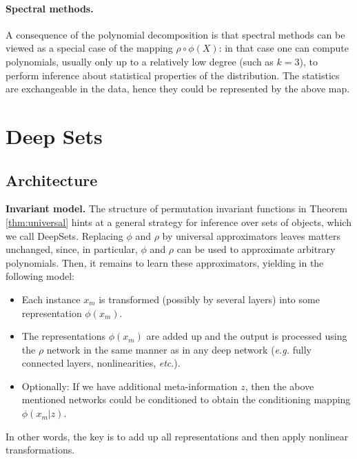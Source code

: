 \documentclass{article}
\newcommand{\refthm}[1]{Theorem \ref{#1}}
\newcommand{\latinphrase}[1]{\emph{#1}}    %
\newcommand{\eg}{\latinphrase{e.g.}\xspace}
\newcommand{\etc}{\latinphrase{etc}\xspace}
\newcommand{\deepsets}{DeepSets\xspace}
\begin{document}
\paragraph{Spectral methods.} 
A consequence of the polynomial decomposition is that spectral methods \cite{AnaGeHsuKakTel12} can be viewed as a special case of the mapping $\rho \circ \phi(X)$: in that case one can compute polynomials, usually only up to a relatively low degree (such as $k=3$), to perform inference about statistical properties of the distribution. The statistics are exchangeable in the data, hence they could be represented by the above map.


\section{Deep Sets}
\label{sec:deep-bs}
\subsection{Architecture}
\textbf{Invariant model.} The structure of permutation invariant functions in \refthm{thm:universal} hints at a general strategy for inference over sets of objects, which we call \deepsets. Replacing $\phi$ and $\rho$ by universal approximators leaves matters unchanged, since, in particular, $\phi$ and $\rho$ can be used to approximate arbitrary polynomials. Then, it remains to learn these approximators, yielding in the following model:
\vspace{-6mm}
\begin{itemize}[leftmargin=3mm, itemsep=0mm,partopsep=0pt,parsep=0pt]
\item Each instance $x_m$ is transformed (possibly by several layers) into some representation $\phi(x_m)$.
\item The representations $\phi(x_m)$ are added up and the output is processed using the $\rho$ network in the same manner as in any deep network (\eg  fully connected layers, nonlinearities, \etc.). 
\item Optionally: If we have additional meta-information $z$, then the above mentioned networks could be conditioned to obtain the conditioning mapping $\phi(x_m|z)$. 
\end{itemize}
\vspace{-3mm}
In other words, the key is to add up all representations and then apply nonlinear transformations. 
\end{document}
